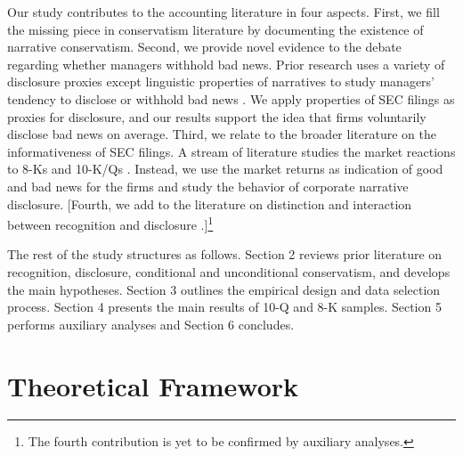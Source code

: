 \documentclass[a4paper]{article}
\begin{document}
\begin{spacing}{2}
Our study contributes to the accounting literature in four aspects. First, we fill the missing piece in conservatism literature by documenting the existence of narrative conservatism. Second, we provide novel evidence to the debate regarding whether managers withhold bad news. Prior research uses a variety of disclosure proxies except linguistic properties of narratives to study managers' tendency to disclose or withhold bad news \cite{skinnerWhyFirmsVoluntarily1994, skinnerEarningsDisclosuresStockholder1997, kothariManagersWithholdBad2009, segalAreManagersStrategic2016, baoManagersDiscloseWithhold2019}. We apply properties of SEC filings as proxies for disclosure, and our results support the idea that firms voluntarily disclose bad news on average. Third, we relate to the broader literature on the informativeness of SEC filings. A stream of literature studies the market reactions to 8-Ks  and 10-K/Qs . Instead, we use the market returns as indication of good and bad news for the firms and study the behavior of corporate narrative disclosure. [Fourth, we add to the literature on distinction and interaction between recognition and disclosure .]\footnote{The fourth contribution is yet to be confirmed by auxiliary analyses.}

The rest of the study structures as follows. Section 2 reviews prior literature on recognition, disclosure, conditional and unconditional conservatism, and develops the main hypotheses. Section 3 outlines the empirical design and data selection process. Section 4 presents the main results of 10-Q and 8-K samples. Section 5 performs auxiliary analyses and Section 6 concludes.

\section{Theoretical Framework}

\end{spacing}
\end{document}

